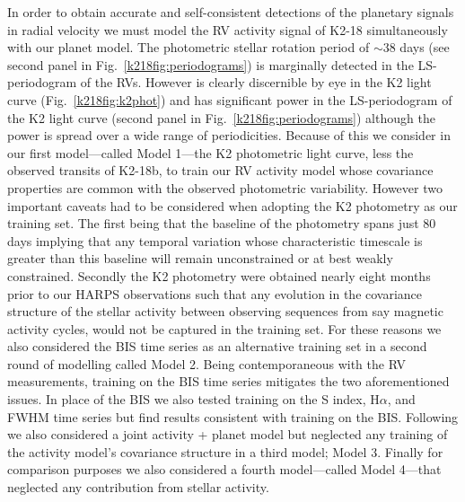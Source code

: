 In order to obtain accurate and self-consistent detections of the planetary signals in radial velocity
we must model the RV activity signal of K2-18 simultaneously with our planet model. The  
photometric stellar rotation period of $\sim 38$ days (see second panel in Fig.~\ref{k218fig:periodograms}) is
marginally detected in the LS-periodogram of the RVs. However \prot{} is clearly discernible by eye in the
K2 light curve (Fig.~\ref{k218fig:k2phot}) and has significant power in the LS-periodogram of the K2 light curve
(second panel in Fig.~\ref{k218fig:periodograms}) although the power is spread over a wide range of periodicities.
Because of this we consider in our first model---called Model 1---the
K2 photometric light curve, less the observed transits of K2-18b, to train our RV activity model whose covariance
properties are common with the observed photometric variability. However two important caveats had to be considered when adopting
the K2 photometry as our training set. The first being that the baseline of the photometry spans just 80 days
implying that any temporal variation whose characteristic timescale is greater than this baseline will
remain unconstrained or at best weakly constrained. Secondly the K2 photometry were obtained nearly eight
months prior to our HARPS observations such that any evolution in the covariance structure of the stellar
activity between
observing sequences from say magnetic activity cycles, would not be captured in the training set. For these
reasons we also considered the BIS time series as an alternative training set in a
second round of modelling called Model 2.
Being contemporaneous with the RV measurements, training on the BIS time series mitigates the two
aforementioned issues. In place of the BIS we also tested training on the S index, H$\alpha$, and
FWHM time series but find results consistent with training on the BIS. Following \cite{faria16} we also
considered a joint activity + planet model but neglected any training of the activity model's covariance structure in
a third model; Model 3. Finally for comparison
purposes we also considered a fourth model---called Model 4---that neglected any contribution from stellar
activity. \\

